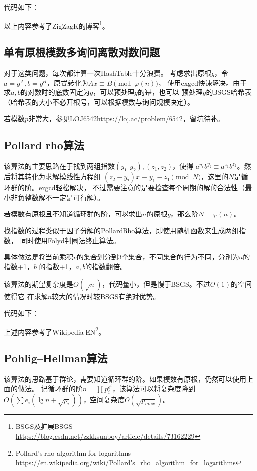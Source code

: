 代码如下：


以上内容参考了ZigZagK的博客\footnote{BSGS及扩展BSGS\\
\url{https://blog.csdn.net/zzkksunboy/article/details/73162229}}。
\subsection{单有原根模数多询问离散对数问题}
对于这类问题，每次都计算一次HashTable十分浪费。
考虑求出原根$g$，令$a=g^A,b=g^B$，原式转化为$Ax\equiv B\pmod{\varphi(n)}$，
使用exgcd快速解决。由于求$a,b$的对数时的底数固定为$g$，可以预处理$g$的幂，也可以
预处理$g$的BSGS哈希表（哈希表的大小不必开根号，可以根据模数与询问规模决定）。

若模数$p$非常大，参见LOJ6542\url{https://loj.ac/problem/6542}，留坑待补。

\subsection{Pollard rho算法}

该算法的主要思路在于找到两组指数$(y_1,y_2),(z_1,z_2)$，使得
$a^{y_1}b^{y_2}\equiv a^{z_1}b^{z_2}$。然后将其转化为求解模线性方程组
$(z_2-y_2)x\equiv y_1-z_1\pmod{N}$，这里的$N$是循环群的阶。exgcd轻松解决，
不过需要注意的是要检查每个周期的解的合法性（最小非负整数解不一定是可行解）。

若模数有原根且不知道循环群的阶，可以求出$n$的原根$g$，那么阶$N=\varphi(n)$。

找指数的过程类似于因子分解的PollardRho算法，即使用随机函数来生成两组指数，
同时使用Folyd判圈法终止算法。

具体做法是将当前乘积$v$的集合划分到3个集合，不同集合的行为不同，分别为$a$的指数+1，$b$
的指数+1，$a,b$的指数翻倍。

该算法的期望复杂度是$O(\sqrt{n})$，代码量小，但是慢于BSGS。不过$O(1)$的空间使得它
在求解$n$较大的情况时较BSGS有绝对优势。

代码如下：


上述内容参考了Wikipedia-EN\footnote{
    Pollard's rho algorithm for logarithms
    \url{https://en.wikipedia.org/wiki/Pollard's\_rho\_algorithm\_for\_logarithms}
}。
\subsection{Pohlig–Hellman算法}
该算法的思路基于群论，需要知道循环群的阶。如果模数有原根，仍然可以使用上面的做法。
记循环群的阶$n=\displaystyle \prod{p_i^{e^i}}$，该算法可以将复杂度降到
$O(\displaystyle \sum{e_i(\lg n+\sqrt{p_i})})$，空间复杂度$O(\sqrt{p_{max}})$。

